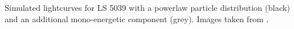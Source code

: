 Simulated lightcurves for LS 5039 with a powerlaw particle distribution (black) and an additional mono-energetic component (grey). Images taken from \cite{2015A&A...581A..27D}.